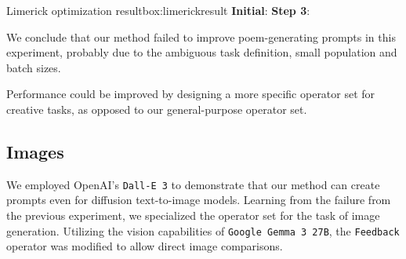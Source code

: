 \begin{figurebox}{Limerick optimization result}{box:limerickresult}
\textbf{Initial}:
\textbf{Step 3}:
\end{figurebox}

We conclude that our method failed to improve poem-generating prompts in this experiment, probably due to the 
ambiguous task definition, small population and batch sizes. 

Performance could be improved by designing 
a more specific operator set for creative tasks, as opposed to our general-purpose operator set.

\subsection{Images}
We employed OpenAI's \texttt{Dall-E 3}\cite{BetkerImprovingIG} to demonstrate that our method can create prompts even for diffusion text-to-image models.
Learning from the failure from the previous experiment, we specialized the operator set for the task of image generation.
Utilizing the vision capabilities of \texttt{Google Gemma 3 27B}, the \texttt{Feedback} operator was modified to allow direct image comparisons. 

